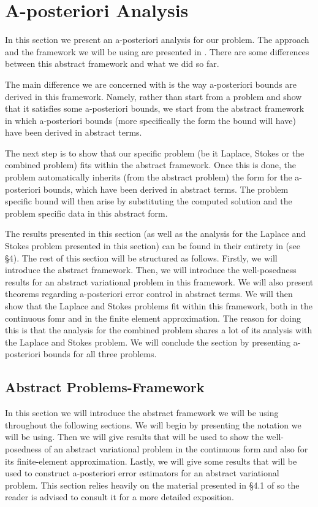 \documentclass[12pt,a4paper]{article}
\theoremstyle{definition}
\begin{document}
\section{A-posteriori Analysis} \label{sec_aposteriori_analysis}
In this section we present an a-posteriori analysis for our problem.  The approach and the framework we will be using are presented in \cite{verfurth2013posteriori}.  There are some differences between this abstract framework and what we did so far.  

The main difference we are concerned with is the way a-posteriori bounds are derived in this framework.  Namely,  rather than start from a problem and show that it satisfies some a-posteriori bounds, we start from the abstract framework in which a-posteriori bounds (more specifically the form the bound will have) have been derived in abstract terms.  

The next step is to show that our specific problem (be it Laplace, Stokes or the combined problem) fits within the abstract framework.  Once this is done, the problem automatically inherits (from the abstract problem) the form for the  a-posteriori  bounds, which have been derived in abstract terms.  The problem specific bound will then arise  by substituting the computed solution and the problem specific data in this abstract form. 

The results presented in this section (as well as the analysis for the Laplace and Stokes problem presented in this section) can be found in their entirety in \cite{verfurth2013posteriori} (see \S 4). The rest of this section will be structured as follows.  Firstly, we will introduce the abstract framework.  Then, we will introduce the well-posedness results for an abstract variational problem in this framework.   We will also present theorems regarding a-posteriori error control in abstract terms.  We will then show that the Laplace and Stokes problems fit within this framework, both in the continuous fomr and in the finite element approximation. The reason for doing this is that the analysis for the combined problem shares a lot of its analysis with the Laplace and Stokes problem.   We will conclude the section by presenting a-posteriori bounds for all three problems.   


\subsection{Abstract Problems-Framework}\label{sec_abst_var_prob}
In this section we will introduce the abstract framework we will be using throughout the following sections.  We will begin by presenting the notation we will be using.  Then we will give results that will be used to show the well-posedness of an abstract variational problem in the continuous form and also for its finite-element approximation.  Lastly, we will give some results that will be used to construct a-posteriori error estimators for an abstract variational problem. This section relies heavily on the material presented in \S 4.1 of \cite{verfurth2013posteriori} so the reader is advised to consult it for a more detailed exposition.
\end{document}
